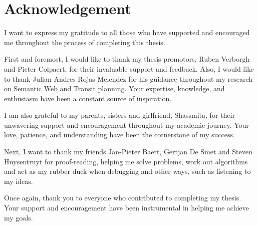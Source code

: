 \chapter*{Acknowledgement}

I want to express my gratitude to all those who have supported and encouraged me throughout the process of completing this thesis.

First and foremost, I would like to thank my thesis promotors, Ruben Verborgh and Pieter Colpaert, for their invaluable support and feedback. Also, I would like to thank Julian Andres Rojas Melendez for his guidance throughout my research on Semantic Web and Transit planning. Your expertise, knowledge, and enthusiasm have been a constant source of inspiration.

I am also grateful to my parents, sisters and girlfriend, Shassmita, for their unwavering support and encouragement throughout my academic journey. Your love, patience, and understanding have been the cornerstone of my success.

Next, I want to thank my friends Jan-Pieter Baert, Gertjan De Smet and Steven Huysentruyt for proof-reading, helping me solve problems, work out algorithms and act as my rubber duck when debugging and other ways, such as listening to my ideas.

Once again, thank you to everyone who contributed to completing my thesis. Your support and encouragement have been instrumental in helping me achieve my goals.
